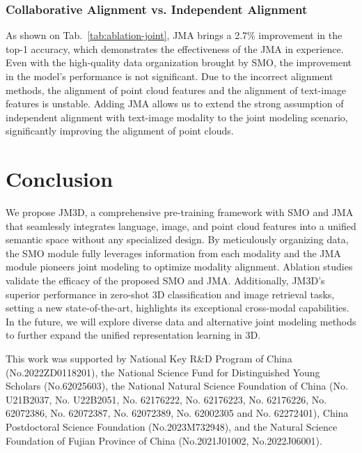 \documentclass[sigconf]{acmart}
\begin{document}
\subsubsection{\textbf{Collaborative Alignment vs. Independent Alignment}}

As shown on Tab.~\ref{tab:ablation-joint}, JMA brings a 2.7\% improvement in the top-1 accuracy, which demonstrates the effectiveness of the JMA in experience. Even with the high-quality data organization brought by SMO, the improvement in the model's performance is not significant. Due to the incorrect alignment methods, the alignment of point cloud features and the alignment of text-image features is unstable. Adding JMA allows us to extend the strong assumption of independent alignment with text-image modality to the joint modeling scenario, significantly improving the alignment of point clouds.

\section{Conclusion}

We propose JM3D, a comprehensive pre-training framework with SMO and JMA that seamlessly integrates language, image, and point cloud features into a unified semantic space without any specialized design. By meticulously organizing data, the SMO module fully leverages information from each modality and the JMA module pioneers joint modeling to optimize modality alignment. Ablation studies validate the efficacy of the proposed SMO and JMA. Additionally, JM3D's superior performance in zero-shot 3D classification and image retrieval tasks, setting a new state-of-the-art, highlights its exceptional cross-modal capabilities. In the future, we will explore diverse data and alternative joint modeling methods to further expand the unified representation learning in 3D.


\begin{acks}

This work was supported by National Key R\&D Program of China (No.2022ZD0118201), the National Science Fund for Distinguished Young Scholars (No.62025603), the National Natural Science Foundation of China (No. U21B2037, No. U22B2051, No. 62176222, No. 62176223, No. 62176226, No. 62072386, No. 62072387, No. 62072389, No. 62002305 and No. 62272401), China Postdoctoral Science Foundation (No.2023M732948), and the Natural Science Foundation of Fujian Province of China (No.2021J01002,  No.2022J06001).
\end{acks}
\end{document}
